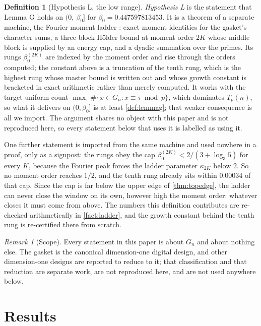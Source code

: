 \documentclass[11pt]{amsart}
\theoremstyle{definition}
\newtheorem{definition}[theorem]{Definition}
\theoremstyle{remark}
\newtheorem{remark}[theorem]{Remark}
\begin{document}
\begin{definition}[Hypothesis L, the low range]
\label{def:hypL}
\emph{Hypothesis L} is the statement that Lemma G holds on $(0,\ \beta_0]$ for $\beta_0 = 0.447597813453$. It is a theorem of a separate machine, the Fourier moment ladder \cite{ladder}: exact moment identities for the gasket's character sums, a three-block H\"older bound at moment order $2K$ whose middle block is supplied by an energy cap, and a dyadic summation over the primes. Its rungs $\beta_0^{(2K)}$ are indexed by the moment order and rise through the orders computed; the constant above is a truncation of the tenth rung, which is the highest rung whose master bound is written out and whose growth constant is bracketed in exact arithmetic rather than merely computed. It works with the target-uniform count $\max_\tau \#\{x \in G_n : x \equiv \tau \bmod p\}$, which dominates $T_p(n)$, so what it delivers on $(0,\beta_0]$ is at least \cref{def:lemmag}; that weaker consequence is all we import. The argument shares no object with this paper and is not reproduced here, so every statement below that uses it is labelled as using it.

One further statement is imported from the same machine and used nowhere in a proof, only as a signpost: the rungs obey the cap $\beta_0^{(2K)} < 2/(3 + \log_3 5)$ for every $K$, because the Fourier peak forces the ladder parameter $\kappa_{2K}$ below $2$. So no moment order reaches $1/2$, and the tenth rung already sits within $0.00034$ of that cap. Since the cap is far below the upper edge of \cref{thm:topedge}, the ladder can never close the window on its own, however high the moment order: whatever closes it must come from above. The numbers this definition contributes are re-checked arithmetically in \cref{fact:ladder}, and the growth constant behind the tenth rung is re-certified there from scratch.
\end{definition}

\begin{remark}[Scope]
\label{rem:census}
Every statement in this paper is about $G_n$ and about nothing else. The gasket is the canonical dimension-one digital design, and other dimension-one designs are reported to reduce to it; that classification and that reduction are separate work, are not reproduced here, and are not used anywhere below.
\end{remark}

\section{Results}
\label{sec:results}
\end{document}
